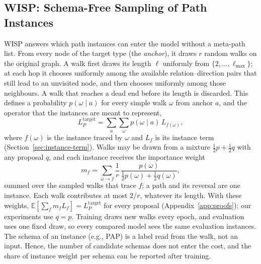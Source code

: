 \documentclass{article}
\newcommand{\wisp}{\textsc{WISP}}
\begin{document}
\subsection{\wisp{}: Schema-Free Sampling of Path Instances}
\label{sec:wisp}
\wisp{} answers which path instances can enter the model without a meta-path list. From every node of the target type (the \emph{anchor}), it draws $r$ random walks on the original graph. A walk first draws its length $\ell$ uniformly from $\{2,\ldots,\ell_{\max}\}$; at each hop it chooses uniformly among the available relation--direction pairs that still lead to an unvisited node, and then chooses uniformly among those neighbours. A walk that reaches a dead end before its length is discarded. This defines a probability $p(\omega\mid a)$ for every simple walk $\omega$ from anchor $a$, and the operator that the instances are meant to represent,
\begin{equation}
  L_P^{\mathrm{target}}=\sum_{a}\sum_{\omega}p(\omega\mid a)\,L_{f(\omega)},
  \label{eq:target}
\end{equation}
where $f(\omega)$ is the instance traced by $\omega$ and $L_f$ is its instance term (Section~\ref{sec:instance-term}). Walks may be drawn from a mixture $\tfrac12p+\tfrac12q$ with any proposal $q$, and each instance receives the importance weight
\begin{equation}
  m_f=\sum_{\omega\rightarrow f}\frac{1}{r}\,\frac{p(\omega)}{\tfrac12p(\omega)+\tfrac12q(\omega)},
  \label{eq:mf}
\end{equation}
summed over the sampled walks that trace $f$; a path and its reversal are one instance. Each walk contributes at most $2/r$, whatever its length. With these weights, $\mathbb{E}[\sum_f m_fL_f]=L_P^{\mathrm{target}}$ for every proposal (Appendix~\ref{app:proofs}); our experiments use $q=p$. Training draws new walks every epoch, and evaluation uses one fixed draw, so every compared model sees the same evaluation instances. The schema of an instance (e.g., PAP) is a label read from the walk, not an input. Hence, the number of candidate schemas does not enter the cost, and the share of instance weight per schema can be reported after training.
\end{document}
